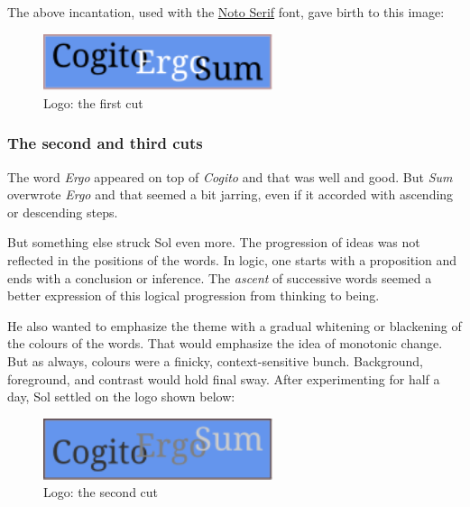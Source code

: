 \documentclass[
  12pt,
  british,
  a4paper,
]{article}
\makeatletter
\newcounter{figno}
\newenvironment{fignos:no-prefix-figure-caption}{
      \caption@ifcompatibility{}{
        \let\oldthefigure\thefigure
        \let\oldtheHfigure\theHfigure
        \renewcommand{\thefigure}{figno:\thefigno}
        \renewcommand{\theHfigure}{figno:\thefigno}
        \stepcounter{figno}
        \captionsetup{labelformat=empty}
      }
    }{
      \caption@ifcompatibility{}{
        \captionsetup{labelformat=default}
        \let\thefigure\oldthefigure
        \let\theHfigure\oldtheHfigure
        \addtocounter{figure}{-1}
      }
    }
\makeatother
\begin{document}
The above incantation, used with the
\href{https://fonts.google.com/specimen/Noto+Serif}{Noto Serif} font,
gave birth to this image:

\begin{fignos:no-prefix-figure-caption}

\begin{figure}
\centering
\includegraphics[width=0.6\textwidth,height=\textheight]{images/firstcut.svg}
\caption{Logo: the first cut}
\end{figure}

\end{fignos:no-prefix-figure-caption}

\hypertarget{the-second-and-third-cuts}{%
\subsubsection{The second and third
cuts}\label{the-second-and-third-cuts}}

The word \emph{Ergo} appeared on top of \emph{Cogito} and that was well
and good. But \emph{Sum} overwrote \emph{Ergo} and that seemed a bit
jarring, even if it accorded with ascending or descending steps.

But something else struck Sol even more. The progression of ideas was
not reflected in the positions of the words. In logic, one starts with a
proposition and ends with a conclusion or inference. The \emph{ascent}
of successive words seemed a better expression of this logical
progression from thinking to being.

He also wanted to emphasize the theme with a gradual whitening or
blackening of the colours of the words. That would emphasize the idea of
monotonic change. But as always, colours were a finicky,
context-sensitive bunch. Background, foreground, and contrast would hold
final sway. After experimenting for half a day, Sol settled on the logo
shown below:

\begin{fignos:no-prefix-figure-caption}

\begin{figure}
\centering
\includegraphics[width=0.6\textwidth,height=\textheight]{images/secondcut.svg}
\caption{Logo: the second cut}
\end{figure}

\end{fignos:no-prefix-figure-caption}
\end{document}
